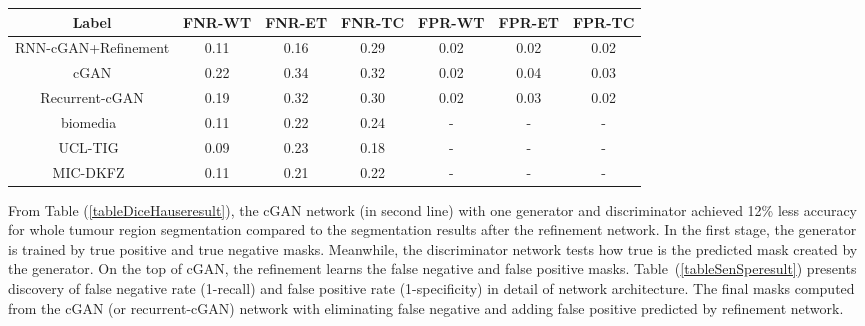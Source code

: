 \documentclass[10pt,twocolumn,letterpaper]{article}
\begin{document}
\begin{table*}[!htbp]
\centering
\caption{Comparison and the achieved accuracy for semantic segmentation in terms of false negative rate or FNR= $1- \frac {TruePositive} {TruePositive+FalseNegative}$ and false positive rate or FPR=$1 - \frac {TrueNegative} {TrueNegative+FalsePositive}$ on validation data. The terms of WT, ET, and TC are abbreviations of whole tumor region, enhanced tumor region, and core of tumor respectively.}
\begin{tabular}{*7c}
\toprule
Label    &  FNR-WT   & FNR-ET   & FNR-TC &  FPR-WT   & FPR-ET   & FPR-TC   \\
\midrule
RNN-cGAN+Refinement  &  0.11 & 0.16  & 0.29  & 0.02 & 0.02 & 0.02 \\
cGAN  &  0.22 & 0.34 & 0.32  &  0.02  &  0.04  & 0.03   \\
Recurrent-cGAN  &  0.19 & 0.32 & 0.30  &  0.02  &  0.03  & 0.02   \\
biomedia~\cite{pawlowski2018ensembles} &  0.11 & 0.22 & 0.24  & - & -  & - \\
UCL-TIG~\cite{wang2017automatic}& 0.09 & 0.23 & 0.18 & - & - & - \\
MIC-DKFZ~\cite{isensee2017brain} & 0.11 & 0.21 & 0.22 & - & - & - \\
\bottomrule
\end{tabular}
\label{tableSenSperesult}
\end{table*}

From Table (\ref{tableDiceHauseresult}), the cGAN network (in second line) with one generator and discriminator achieved 12\% less accuracy for whole tumour region segmentation compared to the segmentation results after the refinement network.
In the first stage, the generator is trained by true positive and true negative masks.
Meanwhile, the discriminator network tests how true is the predicted mask created by the generator.
On the top of cGAN, the refinement learns the false negative and false positive masks.
Table~(\ref{tableSenSperesult}) presents discovery of false negative rate (1-recall) and false positive rate (1-specificity) in detail of network architecture.
The final masks computed from the cGAN (or recurrent-cGAN) network with eliminating false negative and adding false positive predicted by refinement network.
\end{document}

